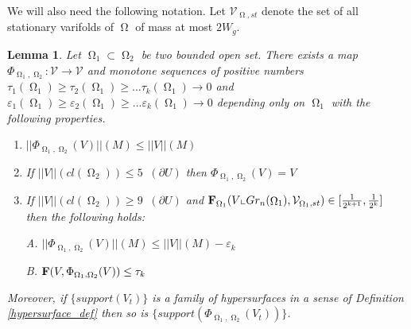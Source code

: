 \documentclass[12pt]{amsart}
\newtheorem{lemma}[theorem]{Lemma}
\DeclareMathOperator{\Hn}{\mathcal{H}^n}
\DeclareMathOperator{\Om}{\Omega}
\newcommand{\Cgs}{5 \Hn(\partial U)}
\newcommand{\Clgs}{9 \Hn(\partial U)}
\theoremstyle{definition}
\begin{document}
We will also need the following notation.
%
Let $\mathcal{V}_{\Om,st}$ denote the set of all stationary 
varifolds of $\Om$ of mass at most $2W_g$.

\begin{lemma} \label{local pull-tight}
Let $\Om_1 \subset \Om_2$ be two bounded open set.
There exists a map
$\Phi_{\Om_1, \Om_2}: \mathcal{V} \rightarrow \mathcal{V}$
and monotone sequences of positive numbers 
$\tau_1(\Om_1) \geq \tau_2(\Om_1) \geq ... \tau_k(\Om_1) \rightarrow 0$
and $\varepsilon_1(\Om_1) \geq \varepsilon_2(\Om_1) \geq ... \varepsilon_k(\Om_1) \rightarrow 0$
depending only on $\Om_1$ with the following properties.


\begin{enumerate}
    \item $||\Phi_{\Om_1, \Om_2}(V)||(M) \leq ||V||(M)$
    
    \item If $||V||(cl(\Om_2)) \leq \Cgs$
    then $\Phi_{\Om_1, \Om_2}(V)=V$
    
    \item If  $||V||(cl(\Om_2)) \geq \Clgs$
    and ${\bf F}_{\Om_1}(V \llcorner Gr_n(\Om_1), \mathcal{V}_{\Om_1,st}) \in [\frac{1}{2^{k+1}},\frac{1}{2^k}]$
    then the following holds:
    
    A. $||\Phi_{\Om_1, \Om_2}(V)||(M) \leq ||V||(M) - \varepsilon_k$
    
    B. ${\bf F} (V, \Phi_{\Om_1, \Om_2}(V)) \leq \tau_k$
\end{enumerate}

Moreover, if $\{ support(V_t) \}$ is a family
of hypersurfaces
in a sense of Definition \ref*{hypersurface_def}
then so is $\{ support(\Phi_{\Om_1, \Om_2}(V_t)) \}$.

\end{lemma}
\end{document}
